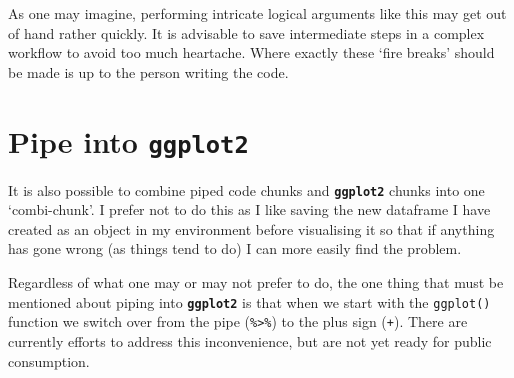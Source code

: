 \documentclass[
]{book}
\begin{document}
As one may imagine, performing intricate logical arguments like this may get out of hand rather quickly. It is advisable to save intermediate steps in a complex workflow to avoid too much heartache. Where exactly these `fire breaks' should be made is up to the person writing the code.

\hypertarget{pipe-into-ggplot2}{%
\section{\texorpdfstring{Pipe into \textbf{\texttt{ggplot2}}}{Pipe into ggplot2}}\label{pipe-into-ggplot2}}

It is also possible to combine piped code chunks and \textbf{\texttt{ggplot2}} chunks into one `combi-chunk'. I prefer not to do this as I like saving the new dataframe I have created as an object in my environment before visualising it so that if anything has gone wrong (as things tend to do) I can more easily find the problem.

Regardless of what one may or may not prefer to do, the one thing that must be mentioned about piping into \textbf{\texttt{ggplot2}} is that when we start with the \texttt{ggplot()} function we switch over from the pipe (\texttt{\%\textgreater{}\%})
to the plus sign (\texttt{+}). There are currently efforts to address this inconvenience, but are not yet ready for public consumption.
\end{document}
